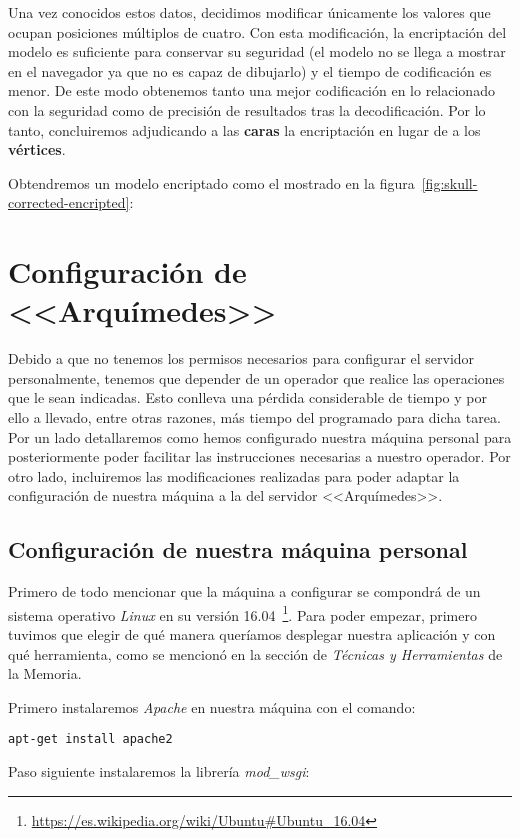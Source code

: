 Una vez conocidos estos datos, decidimos modificar únicamente los valores que ocupan posiciones múltiplos de cuatro. Con esta modificación, la encriptación del modelo es suficiente para conservar su seguridad (el modelo no se llega a mostrar en el navegador ya que no es capaz de dibujarlo) y el tiempo de codificación es menor. De este modo obtenemos tanto una mejor codificación en lo relacionado con la seguridad como de precisión de resultados tras la decodificación. Por lo tanto, concluiremos adjudicando a las \textbf{caras} la encriptación en lugar de a los \textbf{vértices}.

Obtendremos un modelo encriptado como el mostrado en la figura~\ref{fig:skull-corrected-encripted}:

\section{Configuración de  <<Arquímedes>>}\label{sec:arquimedes-conf}
Debido a que no tenemos los permisos necesarios para configurar el servidor personalmente, tenemos que depender de un operador que realice las operaciones que le sean indicadas. Esto conlleva una pérdida considerable de tiempo y por ello a llevado, entre otras razones, más tiempo del programado para dicha tarea. Por un lado detallaremos como hemos configurado nuestra máquina personal para posteriormente poder facilitar las instrucciones necesarias a nuestro operador. Por otro lado, incluiremos las modificaciones realizadas para poder adaptar la configuración de nuestra máquina a la del servidor <<Arquímedes>>.

\subsection{Configuración de nuestra máquina personal}
Primero de todo mencionar que la máquina a configurar se compondrá de un sistema operativo \textit{Linux} en su versión 16.04~\footnote{\url{https://es.wikipedia.org/wiki/Ubuntu\#Ubuntu\_16.04}}. Para poder empezar, primero tuvimos que elegir de qué manera queríamos desplegar nuestra aplicación y con qué herramienta, como se mencionó en la sección de \textit{Técnicas y Herramientas} de la Memoria.

Primero instalaremos \textit{Apache} en nuestra máquina con el comando:

\noindent\verb|apt-get install apache2|

Paso siguiente instalaremos la librería \textit{mod\_wsgi}:

